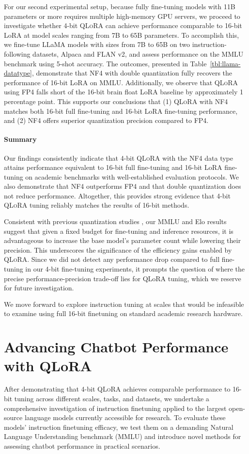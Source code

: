 For our second experimental setup, because fully fine-tuning models with 11B parameters or more requires multiple high-memory GPU servers, we proceed to investigate whether 4-bit \textsc{QLoRA} can achieve performance comparable to 16-bit LoRA at model scales ranging from 7B to 65B parameters. To accomplish this, we fine-tune LLaMA models with sizes from 7B to 65B on two instruction-following datasets, Alpaca and FLAN v2, and assess performance on the MMLU benchmark using 5-shot accuracy. The outcomes, presented in Table~\ref{tbl:llama-datatype}, demonstrate that NF4 with double quantization fully recovers the performance of 16-bit LoRA on MMLU. Additionally, we observe that \textsc{QLoRA} using FP4 falls short of the 16-bit brain float LoRA baseline by approximately 1 percentage point. This supports our conclusions that (1) \textsc{QLoRA} with NF4 matches both 16-bit full fine-tuning and 16-bit LoRA fine-tuning performance, and (2) NF4 offers superior quantization precision compared to FP4.

\paragraph{Summary} Our findings consistently indicate that 4-bit \textsc{QLoRA} with the NF4 data type attains performance equivalent to 16-bit full fine-tuning and 16-bit LoRA fine-tuning on academic benchmarks with well-established evaluation protocols. We also demonstrate that NF4 outperforms FP4 and that double quantization does not reduce performance. Altogether, this provides strong evidence that 4-bit \textsc{QLoRA} tuning reliably matches the results of 16-bit methods.

Consistent with previous quantization studies \citep{dettmers2022case}, our MMLU and Elo results suggest that given a fixed budget for fine-tuning and inference resources, it is advantageous to increase the base model's parameter count while lowering their precision. This underscores the significance of the efficiency gains enabled by \textsc{QLoRA}. Since we did not detect any performance drop compared to full fine-tuning in our 4-bit fine-tuning experiments, it prompts the question of where the precise performance-precision trade-off lies for QLoRA tuning, which we reserve for future investigation.

We move forward to explore instruction tuning at scales that would be infeasible to examine using full 16-bit finetuning on standard academic research hardware.

\section{Advancing Chatbot Performance with QLoRA}
\label{sec:pushing}
After demonstrating that 4-bit \textsc{QLoRA} achieves comparable performance to 16-bit tuning across different scales, tasks, and datasets, we undertake a comprehensive investigation of instruction finetuning applied to the largest open-source language models currently accessible for research. To evaluate these models' instruction finetuning efficacy, we test them on a demanding Natural Language Understanding benchmark (MMLU) and introduce novel methods for assessing chatbot performance in practical scenarios.

